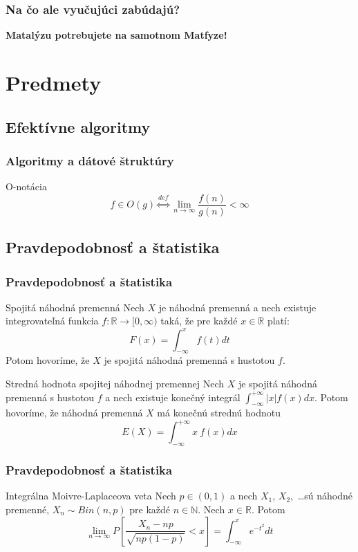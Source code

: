 \documentclass{beamer}
\begin{document}
% 

\begin{frame}
\frametitle{Na čo ale vyučujúci zabúdajú?}
\pause
\begin{center}
\textbf{{\Large Matalýzu potrebujete na samotnom Matfyze!}}
\end{center}
\end{frame}

\section{Predmety}

\subsection{Efektívne algoritmy}

\begin{frame}
\frametitle{Algoritmy a dátové štruktúry}
\begin{block}{O-notácia}
$$f \in O(g) \overset{def}{\Longleftrightarrow} \lim_{n\to\infty} \dfrac{f(n)}{g(n)} < \infty$$
\end{block}
\end{frame}

\subsection{Pravdepodobnosť a štatistika}
\begin{frame}
\frametitle{Pravdepodobnosť a štatistika}
\pause
\begin{block}{Spojitá náhodná premenná}
Nech $X$ je náhodná premenná a nech existuje integrovateľná funkcia $f: \mathbb{R} \rightarrow [0, \infty)$ taká, že pre každé $x \in \mathbb{R}$ platí:
$$F(x) = \int_{-\infty}^{x} f(t) dt$$
Potom hovoríme, že $X$ je spojitá náhodná premenná s  hustotou $f$.
\end{block}

\begin{block}{Stredná hodnota spojitej náhodnej premennej}
Nech $X$ je spojitá náhodná premenná s hustotou $f$ a nech 
existuje konečný integrál $\int_{-\infty}^{+\infty}|x| f(x) dx$. 
Potom hovoríme, že náhodná premenná $X$ má konečnú strednú hodnotu
$$E(X) = \int_{-\infty}^{+\infty} x~f(x) dx $$
\end{block}
\end{frame}

\begin{frame}
\frametitle{Pravdepodobnosť a štatistika}
\begin{block}{Integrálna Moivre-Laplaceova veta}
Nech $p \in (0, 1)$ a nech $X_1$, $X_2$, \ldots sú náhodné premenné, 
$X_n \sim Bin(n, p)$ pre každé $n \in \mathbb{N}$. Nech $x \in \mathbb{R}$. 
Potom 
\pause 
$$\lim_{n\to\infty}P \left[ \dfrac{X_n - np}{\sqrt{np(1-p)}} < x \right] = \int_{-\infty}^{x} e^{-t^2} dt$$
\end{block}
\end{frame}
\end{document}
